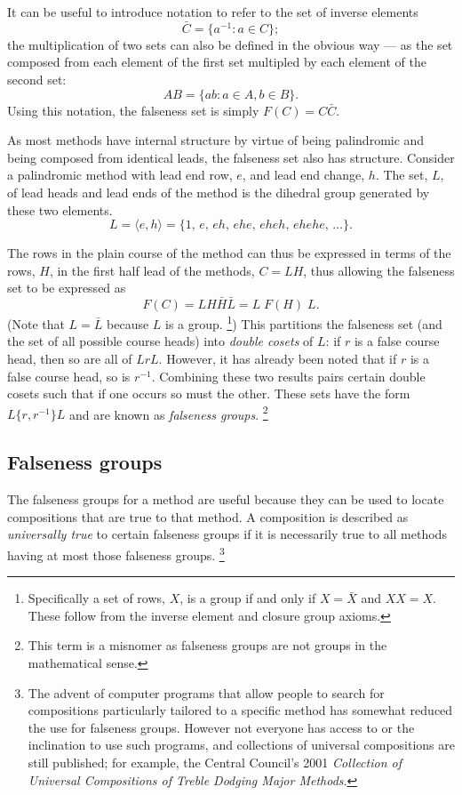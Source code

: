 \documentclass[a4paper,11pt,oneside]{book}
\def\textitidx#1{\textit{#1}\index{#1}}
\begin{document}
It can be useful to introduce notation to refer to the set of inverse elements
\[ \bar{C} = \{ a^{-1} : a \in C \}; \]
the multiplication of two sets can also be defined in the obvious way 
--- as the set composed from each element of the first set multipled by each 
element of the second set: 
\[ AB = \{ a b : a \in A, b \in B \}. \]
Using this notation, the falseness set is simply $F(C) = C\bar{C}$.

As most methods have internal structure by virtue of being palindromic%
 and being composed from identical leads, 
the falseness set also has structure.  
Consider a palindromic method with lead end row, $e$, and lead end change, $h$.
The set, $L$, of lead heads and lead ends of the method is the 
dihedral group generated by these two elements.
\[ L = \langle e, h \rangle 
     = \{ 1,\, e,\, eh,\, ehe,\, eheh,\, ehehe,\, \ldots \}. \]

The rows in the plain course of the method can thus be expressed in terms of
the rows, $H$, in the first half lead of the methods, $C = LH$, thus allowing
the falseness set to be expressed as 
\[ F(C) = L H \bar{H} \bar{L} = L\; F(H)\; L. \]
(Note that $L=\bar{L}$ because $L$ is a group.%
\footnote{Specifically a set of rows, $X$, is a group if and only if
$X=\bar{X}$ and $XX=X$.  
These follow from the inverse element and closure group axioms.})
This partitions the falseness set (and the 
set of all possible course heads) into \textitidx{double cosets} of $L$:
if $r$ is a false course head, then so are all of $LrL$.  However, it has
already been noted that if $r$ is a false course head, so is $r^{-1}$.  
Combining these two results pairs certain double cosets such that if
one occurs so must the other.  These sets have the form $L\{r,r^{-1}\}L$ 
and are known as \textit{falseness groups}.%
\footnote{This term is a misnomer as falseness groups are not groups 
in the mathematical sense.}


\subsection{Falseness groups}

The falseness groups for a method are useful because they can be used to
locate compositions that are true to that method.  A composition is described
as \textitidx{universally true} to certain falseness groups if it is 
necessarily true to all methods having at most those falseness groups.%
\footnote{The advent of computer programs that allow people to search for 
compositions particularly tailored to a specific method has somewhat 
reduced the use  for falseness groups.  
However not everyone has access to or the inclination
to use such programs, and collections of universal compositions are still
published; for example, the Central Council's 2001 
\textit{Collection of Universal Compositions of Treble Dodging Major Methods}.%
}
\end{document}
